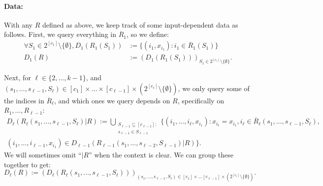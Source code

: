\documentclass{article}
\renewcommand{\>}{\rangle}
\newcommand{\<}{\langle}
\renewcommand{\(}{\left(}
\renewcommand{\)}{\right)}
\begin{document}
\paragraph{Data:} With any $R$ defined as above, we keep track of some input-dependent data as follows. First, we query everything in $\overline{R}_1$, so we define:
\begin{equation}
\begin{split}
\forall S_1\in 2^{[c_1]}\setminus\{\emptyset\}, D_1(R_1(S_1)) &:= \{(i_1,x_{i_1}): i_1\in \overline{R}_1(S_1)\}\\
D_1(R) &:= \left( D_1(R_1(S_1))\right)_{S_1\in 2^{[c_1]}\setminus\{\emptyset\}}.
\end{split}\label{eq:k-dist-D-1}
\end{equation}


Next, for $\ell\in \{2,\dots,k-1\}$, and $(s_1,\dots,s_{\ell-1},S_{\ell})\in [c_1]\times\dots\times [c_{\ell-1}]\times (2^{[c_{\ell}]}\setminus\{\emptyset\})$, we only query some of the indices in $\overline{R}_{\ell}$, and which ones we query depends on $R$, specifically on $R_1,\dots,R_{\ell-1}$:
\begin{multline}
D_{\ell}(R_{\ell}(s_1,\dots,s_{\ell-1},S_{\ell})|R) := \bigcup_{\substack{S_{\ell-1}\subseteq [c_{\ell-1}]:\\ s_{\ell-1}\in S_{\ell-1}}}
\big\{  
(i_1,\dots,i_{\ell},x_{i_1}):x_{i_{\ell}}=x_{i_1},i_{\ell}\in \overline{R}_{\ell}(s_1,\dots,s_{\ell-1},S_{\ell}),\\
 (i_1,\dots,i_{\ell-1},x_{i_1})\in D_{\ell-1}(R_{\ell-1}(s_1,\dots,s_{\ell-2},S_{\ell-1})|R)  
\big\}.
\label{eq:D-ell}
\end{multline}
We will sometimes omit ``$|R$'' when the context is clear. We can group these together to get:
\begin{equation}
D_{\ell}(R) := \left(D_{\ell}(R_{\ell}(s_1,\dots,s_{\ell-1},S_{\ell}))\right)_{(s_1,\dots,s_{\ell-1},S_{\ell})\in [c_1]\times\dots[c_{\ell-1}]\times (2^{[c_{\ell}]}\setminus\{\emptyset\})}.\label{eq:D-ell-R}
\end{equation}
\end{document}
